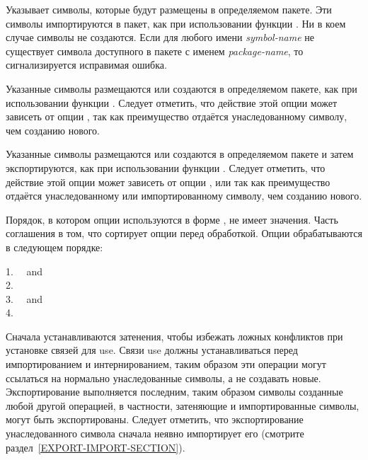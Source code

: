 \begin{defun}[Переменная]
\begin{defmac}
\begin{flushdesc}
\item[\cd{(:import-from \emph{package-name} \Mstar\emph{symbol-name})}]
Указывает символы, которые будут размещены в определяемом пакете.
Эти символы импортируются в пакет, как при использовании функции .
Ни в коем случае символы не создаются.
Если для любого имени \emph{symbol-name} не существует символа доступного в
пакете с именем \emph{package-name}, то сигнализируется исправимая ошибка.

\item[\cd{(:intern \Mstar\emph{symbol-name})}]
Указанные символы размещаются или создаются в определяемом пакете, как
при использовании функции . Следует отметить, что действие этой
опции может зависеть от опции , так как преимущество отдаётся
унаследованному символу, чем созданию нового.

\item[\cd{(:export \Mstar\emph{symbol-name})}]
Указанные символы размещаются или создаются в определяемом пакете и затем
экспортируются, как при использовании функции . Следует отметить,
что действие этой опции может зависеть от опции ,  или
 так как преимущество отдаётся  
унаследованному или импортированному символу, чем созданию нового.
\end{flushdesc}

Порядок, в котором опции используются в форме , не имеет
значения. Часть соглашения в том, что  сортирует опции перед
обработкой.
Опции обрабатываются в следующем порядке:
\begin{tabbing}
1.~~ and  \\
2.~~ \\
3.~~ and  \\
4.~~
\end{tabbing}
Сначала устанавливаются затенения, чтобы избежать ложных конфликтов при
установке связей для use. Связи use должны устанавливаться перед импортированием
и интернированием, таким образом эти операции могут ссылаться на нормально
унаследованные символы, а не создавать новые. Экспортирование выполняется
последним, таким образом символы созданные любой другой операцией, в частности,
затеняющие и импортированные символы, могут быть экспортированы. Следует
отметить, что экспортирование унаследованного символа сначала неявно импортирует
его (смотрите раздел~\ref{EXPORT-IMPORT-SECTION}).


\end{defmac}
\end{defun}
